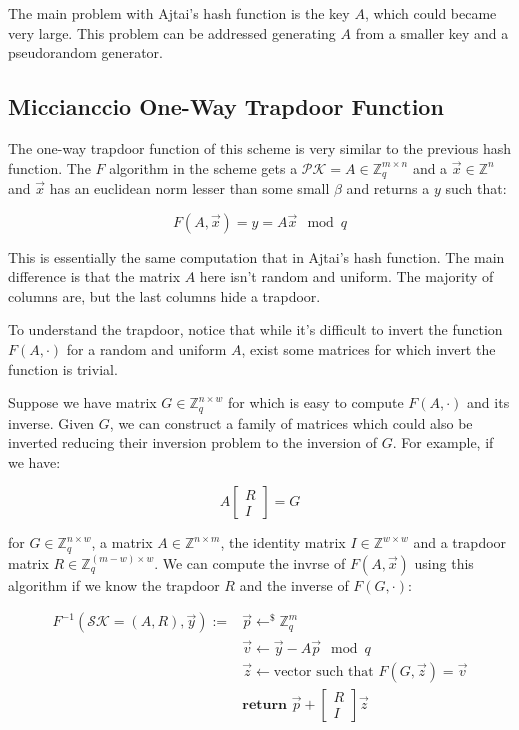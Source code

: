 \documentclass[a4paper]{article}
\begin{document}
The main problem with Ajtai's hash function is the key $A$, which could became very large. This problem can be addressed generating $A$ from a smaller key and a pseudorandom generator.

\subsection{Miccianccio One-Way Trapdoor Function}
 
The one-way trapdoor function of this scheme is very similar to the previous hash function. The $F$ algorithm in the scheme gets a $\mathcal{PK} = A \in \mathbb{Z}_q^{m \times n}$ and a $\overrightarrow{x} \in \mathbb{Z}^n$ and $\overrightarrow{x}$ has an euclidean norm lesser than some small $\beta$ and returns a $y$ such that:

$$
F(A, \overrightarrow{x}) = y = A\overrightarrow{x} \mod q
$$

This is essentially the same computation that in Ajtai's hash function. The main difference is that the matrix $A$ here isn't random and uniform. The majority of columns are, but the last columns hide a trapdoor.

To understand the trapdoor, notice that while it's difficult to invert the function $F(A, \cdot)$ for a random and uniform $A$, exist some matrices for which invert the function is trivial. 

Suppose we have matrix $G \in \mathbb{Z}_q^{n \times w}$ for which is easy to compute $F(A, \cdot)$ and its inverse. Given $G$, we can construct a family of matrices which could also be inverted reducing their inversion problem to the inversion of $G$. For example, if we have:

$$
A\begin{bmatrix}R\\I\end{bmatrix} = G
$$

for $G \in \mathbb{Z}_q^{n \times w}$, a matrix $A \in \mathbb{Z}^{n \times m}$, the identity matrix $I \in \mathbb{Z}^{w \times w}$ and a trapdoor matrix $R \in \mathbb{Z}_q^{(m-w) \times w}$. We can compute  the invrse of $F(A, \overrightarrow{x})$ using this algorithm if we know the trapdoor $R$ and the inverse of $F(G, \cdot)$:

\begin{equation*}
 \begin{split}
F^{-1}(\mathcal{SK}=(A, R), \overrightarrow{y}) :=& \overrightarrow{p} \leftarrow^{\$} \mathbb{Z}_q^m\\
&\overrightarrow{v} \leftarrow \overrightarrow{y} - A\overrightarrow{p} \mod q\\
& \overrightarrow{z} \leftarrow \textrm{vector\ such\ that\ } F(G, \overrightarrow{z})=\overrightarrow{v}\\
&\textbf{return\ }\overrightarrow{p} + \begin{bmatrix}R\\I\end{bmatrix}\overrightarrow{z}
 \end{split}
 \end{equation*}
\end{document}
